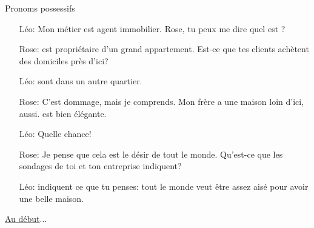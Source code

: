 \begin{frame}{Pronoms possessifs}
  \begin{enumerate}
    \item[Léo:] Mon métier est agent immobilier. Rose, tu peux me dire quel est \underline{}?
    \item[Rose:] \underline{} est propriétaire d'un grand appartement. Est-ce que tes clients achètent des domiciles près d'ici?
    \item[Léo:] \underline{} sont dans un autre quartier.
    \item[Rose:] C'est dommage, mais je comprends. Mon frère a une maison loin d'ici, aussi. \underline{} est bien élégante.
    \item[Léo:] Quelle chance!
    \item[Rose:] Je pense que cela est le désir de tout le monde. Qu'est-ce que les sondages de toi et ton entreprise indiquent?
    \item[Léo:] \underline{} indiquent ce que tu penses: tout le monde veut être assez aisé pour avoir une belle maison.
  \end{enumerate}
  \vspace{0.25cm}
  \raggedleft\raggedleft\hyperlink{début}{Au début}...
\end{frame}